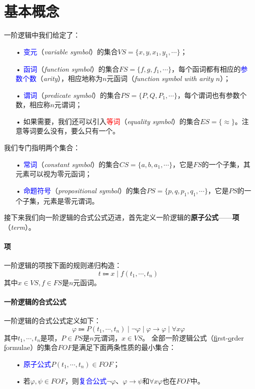 \documentclass[b5paper,oneside]{ctexbook}
\newcommand{\Blue}[1]{\textcolor[named]{blue}{#1}}
\newcommand{\Red}[1]{\textcolor[named]{red}{#1}}
\begin{document}
\section{基本概念}
一阶逻辑中我们给定了：\label{folsets}
\begin{enumerate}
\item[•]\Blue{变元}（\textit{variable symbol}）的集合$VS=\{x,y,x_1,y_1,\cdots\}$；
\item[•]\Blue{函词}（\textit{function symbol}）的集合$FS=\{f,g,f_1,\cdots\}$，每个函词都有相应的\Blue{参数个数}（\textit{arity}），相应地称为$n$元函词（\textit{function symbol with arity $n$}）；
\item[•]\Blue{谓词}（\textit{predicate symbol}）的集合$PS=\{P,Q,P_1,\cdots\}$，每个谓词也有参数个数，相应称$n$元谓词；
\item[•]如果需要，我们还可以引入\Red{等词}（\textit{equality symbol}）的集合$ES=\{\approx\}$。注意等词要么没有，要么只有一个。
\end{enumerate}
我们专门指明两个集合：
\begin{enumerate}
\item[•]\Blue{常词}（\textit{constant symbol}）的集合$CS=\{a,b,a_1,\cdots\}$，它是$FS$的一个子集，其元素可以视为零元函词；
\item[•]\Blue{命题符号}（\textit{propositional symbol}）的集合$PS=\{p,q,p_1,q_1,\cdots\}$，它是$PS$的一个子集，元素是零元谓词。
\end{enumerate}

接下来我们向一阶逻辑的合式公式迈进，首先定义一阶逻辑的\textbf{原子公式}——\textbf{项}（\textit{term}）。
\paragraph{项}一阶逻辑的项按下面的规则递归构造：
\[t\Coloneqq x\mid f(t_1,\cdots ,t_n)\]
其中$x\in VS,f\in FS$是$n$元函词。\label{terms}
\paragraph{一阶逻辑的合式公式}一阶逻辑的合式公式定义如下：\label{folwff}
\[\varphi\Coloneqq P(t_1,\cdots ,t_n)\mid\neg\varphi\mid\varphi\to\varphi\mid\forall x\varphi\]
其中$t_1,\cdots ,t_n$是项，$P\in PS$是$n$元谓词，$x\in VS$。
全部一阶逻辑公式（\underline{f}irst-\underline{o}rder \underline{f}ormulae）的集合$FOF$是满足下面两条性质的最小集合：
\begin{enumerate}
\item[•]\Blue{原子公式}$P(t_1,\cdots ,t_n)\in FOF$；
\item[•]若$\varphi,\psi\in FOF$，则\Blue{复合公式}$\neg\varphi$、$\varphi\to\psi$和$\forall x\varphi$也在$FOF$中。
\end{enumerate}
\end{document}
